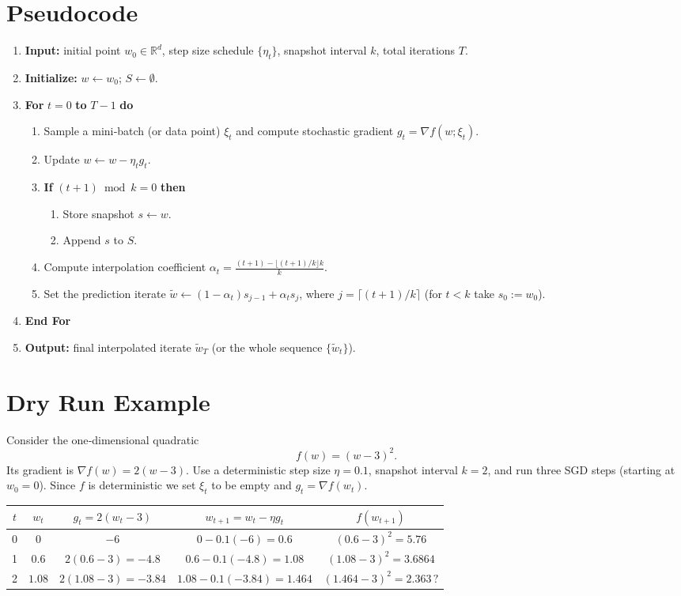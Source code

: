 \documentclass{article}
\newcommand{\R}{\mathbb{R}}
\theoremstyle{definition}
\begin{document}
\section*{Pseudocode}
\begin{enumerate}[leftmargin=*,label={\bf Step \arabic*:},nosep]
\item \textbf{Input:} initial point $w_0\in\R^{d}$, step size schedule
$\{\eta_t\}$, snapshot interval $k$, total iterations $T$.
\item \textbf{Initialize:} $w\leftarrow w_0$; $S\leftarrow\emptyset$.
\item \textbf{For} $t=0$ \textbf{to} $T-1$ \textbf{do}
\begin{enumerate}[label=\roman*.]
\item Sample a mini‑batch (or data point) $\xi_t$ and compute stochastic gradient
$g_t=\nabla f(w;\xi_t)$.
\item Update $w\leftarrow w-\eta_t g_t$.
\item \textbf{If} $(t+1)\bmod k =0$ \textbf{then}
\begin{enumerate}[label=\alph*.]
\item Store snapshot $s\leftarrow w$.
\item Append $s$ to $S$.
\end{enumerate}
\item Compute interpolation coefficient
$\alpha_t =\frac{(t+1)-\lfloor (t+1)/k\rfloor k}{k}$.
\item Set the prediction iterate
$\tilde w \leftarrow (1-\alpha_t)s_{j-1}+ \alpha_t s_{j}$,
where $j=\lceil (t+1)/k\rceil$ (for $t<k$ take $s_0:=w_0$).
\end{enumerate}
\item \textbf{End For}
\item \textbf{Output:} final interpolated iterate $\tilde w_T$ (or the whole
sequence $\{\tilde w_t\}$).
\end{enumerate}

\section*{Dry Run Example}
Consider the one‑dimensional quadratic
\[
f(w)=(w-3)^2 .
\]
Its gradient is $\nabla f(w)=2(w-3)$.  Use a deterministic step size
$\eta=0.1$, snapshot interval $k=2$, and run three SGD steps
(starting at $w_0=0$).  Since $f$ is deterministic we set $\xi_t$ to be
empty and $g_t=\nabla f(w_t)$.

\begin{center}
\begin{tabular}{c|c|c|c|c}
$t$ & $w_t$ & $g_t=2(w_t-3)$ & $w_{t+1}=w_t-\eta g_t$ & $f(w_{t+1})$\\\hline
0 & $0$ & $-6$ & $0-0.1(-6)=0.6$ & $(0.6-3)^2=5.76$\\
1 & $0.6$ & $2(0.6-3)=-4.8$ & $0.6-0.1(-4.8)=1.08$ & $(1.08-3)^2=3.6864$\\
2 & $1.08$ & $2(1.08-3)=-3.84$ & $1.08-0.1(-3.84)=1.464$ & $(1.464-3)^2=2.363\,?$
\end{tabular}
\end{center}
\end{document}
